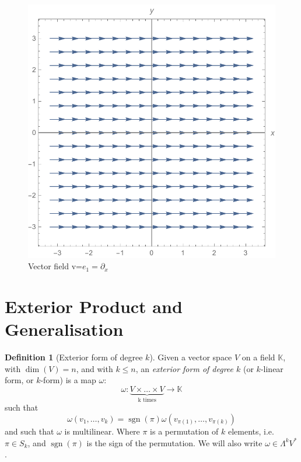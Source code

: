 \documentclass[a4paper,11pt,titlepage]{article}
\numberwithin{equation}{section}
\theoremstyle{definition}
\newtheorem{definition}[theorem]{Definition}
\theoremstyle{remark}
\newtheorem{remark}[theorem]{Remark}
\DeclareMathOperator{\sgn}{sgn}
\newcommand{\rfield}{\mathbb{R}}
\newcommand{\restrict}[2]{{#1}\raisebox{-.5ex}{$|$}_{#2}}
\begin{document}
\begin{figure}[h]
     \centering
     \includegraphics[width=.6\linewidth]{images/vfield_e1.pdf}
     \caption{Vector field v=$e_1=\partial_x$} \label{Fig:vfield_e1}
\end{figure}

\newpage
\section{Exterior Product and Generalisation}

\begin{definition} [Exterior form of degree $k$]
Given a vector space $V$ on a field $\mathbb{K}$, with $\dim(V) = n$, and with $k \le n$, an \textit{exterior form of degree $k$} (or $k$-linear form, or $k$-form) is a map $\omega$:
\begin{equation*}
\omega \colon \underbrace{V \times \ldots \times V}_{\text{k times}} \rightarrow \mathbb{K}
\end{equation*}
such that
\begin{equation*}
\omega(v_1, \ldots, v_k) = \sgn(\pi)\omega(v_{\pi(1)}, \ldots, v_{\pi(k)})
\end{equation*}
and such that $\omega$ is multilinear. Where $\pi$ is a permutation of $k$ elements, i.e. $\pi \in S_k$, and $\sgn(\pi)$ is the sign of the permutation.
We will also write $\omega \in \Lambda ^k V^*$.
\end{definition}
\end{document}
